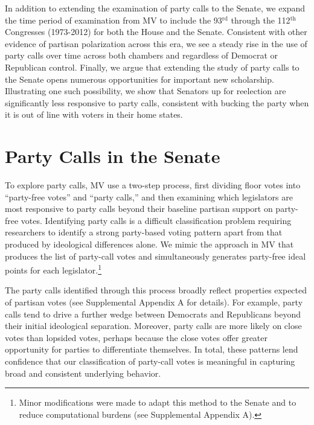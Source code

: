 \documentclass[12pt]{article}
\begin{document}
In addition to extending the examination of party calls to the Senate, we
expand the time period of examination from MV to include the 93$^{\text{rd}}$
through the 112$^{\text{th}}$ Congresses (1973-2012) for both the House and the
Senate.
Consistent with other evidence of partisan polarization across this era, we see
a steady rise in the use of party calls over time across both chambers and
regardless of Democrat or Republican control.
Finally, we argue that extending the study of party calls to the Senate opens
numerous opportunities for important new scholarship.
Illustrating one such possibility, we show that Senators up for reelection are
significantly less responsive to party calls, consistent with bucking the party
when it is out of line with voters in their home states.


\section*{Party Calls in the Senate}


To explore party calls, MV use a two-step process, first dividing floor votes
into ``party-free votes'' and ``party calls,'' and then examining which
legislators are most responsive to party calls beyond their baseline partisan
support on party-free votes.
Identifying party calls is a difficult classification problem requiring
researchers to identify a strong party-based voting pattern apart from that
produced by ideological differences alone.
We mimic the approach in MV that produces the list of party-call votes and
simultaneously generates party-free ideal points for each legislator.\footnote{
  \doublespacing\normalsize
  Minor modifications were made to adapt this method to the Senate and to
  reduce computational burdens (see Supplemental Appendix A).}

The party calls identified through this process broadly reflect properties
expected of partisan votes (see Supplemental Appendix A for details).
For example, party calls tend to drive a further wedge between Democrats and
Republicans beyond their initial ideological separation.
Moreover, party calls are more likely on close votes than lopsided votes,
perhaps because the close votes offer greater opportunity for parties to
differentiate themselves.
In total, these patterns lend confidence that our classification of party-call
votes is meaningful in capturing broad and consistent underlying behavior.
\end{document}
